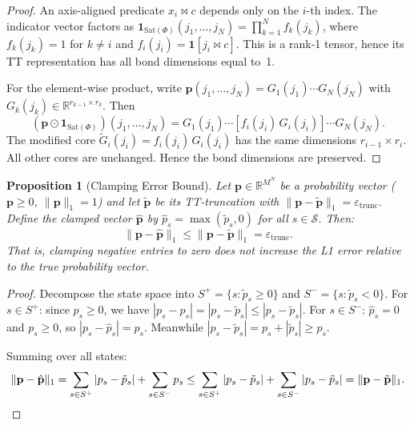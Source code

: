 \documentclass[11pt]{article}
\newtheorem{proposition}[theorem]{Proposition}
\newcommand{\norm}[1]{\lVert #1 \rVert}
\newcommand{\R}{\mathbb{R}}
\newcommand{\eps}{\varepsilon}
\newcommand{\Sat}{\mathrm{Sat}}
\newcommand{\calS}{\mathcal{S}}
\begin{document}
\begin{proof}
An axis-aligned predicate $x_i \bowtie c$ depends only on the
$i$-th index.
The indicator vector factors as
$\mathbf{1}_{\Sat(\Phi)}(j_1,\ldots,j_N) = \prod_{k=1}^{N} f_k(j_k)$,
where $f_k(j_k) = 1$ for $k \neq i$ and
$f_i(j_i) = \mathbf{1}[j_i \bowtie c]$.
This is a rank-1 tensor, hence its TT representation has all
bond dimensions equal to~1.

For the element-wise product, write
$\mathbf{p}(j_1,\ldots,j_N) = G_1(j_1)\cdots G_N(j_N)$
with $G_k(j_k) \in \R^{r_{k-1}\times r_k}$.
Then
\[
  (\mathbf{p} \odot \mathbf{1}_{\Sat(\Phi)})(j_1,\ldots,j_N)
  = G_1(j_1)\cdots [f_i(j_i)\,G_i(j_i)]\cdots G_N(j_N).
\]
The modified core $\tilde{G}_i(j_i) = f_i(j_i)\,G_i(j_i)$ has
the same dimensions $r_{i-1}\times r_i$.
All other cores are unchanged.
Hence the bond dimensions are preserved.
\end{proof}

\begin{proposition}[Clamping Error Bound]\label{prop:clamp}
Let $\mathbf{p} \in \R^{M^N}$ be a probability vector
($\mathbf{p} \geq 0$, $\norm{\mathbf{p}}_1 = 1$) and let
$\tilde{\mathbf{p}}$ be its TT-truncation with
$\norm{\mathbf{p} - \tilde{\mathbf{p}}}_1 = \eps_{\mathrm{trunc}}$.
Define the clamped vector $\hat{\mathbf{p}}$ by
$\hat{p}_s = \max(\tilde{p}_s, 0)$ for all $s \in \calS$.
Then:
\begin{equation}\label{eq:clamp}
  \norm{\mathbf{p} - \hat{\mathbf{p}}}_1
  \leq \norm{\mathbf{p} - \tilde{\mathbf{p}}}_1
  = \eps_{\mathrm{trunc}}.
\end{equation}
That is, clamping negative entries to zero does not increase the
L1 error relative to the true probability vector.
\end{proposition}

\begin{proof}
Decompose the state space into $S^+ = \{s : \tilde{p}_s \geq 0\}$
and $S^- = \{s : \tilde{p}_s < 0\}$.
For $s \in S^+$: since $p_s \geq 0$, we have
$|p_s - \hat{p}_s| = |p_s - \tilde{p}_s| \leq |p_s - \tilde{p}_s|$.
For $s \in S^-$: $\hat{p}_s = 0$ and $p_s \geq 0$, so
$|p_s - \hat{p}_s| = p_s$.
Meanwhile $|p_s - \tilde{p}_s| = p_s + |\tilde{p}_s| \geq p_s$.

Summing over all states:
\[
  \norm{\mathbf{p} - \hat{\mathbf{p}}}_1
  = \sum_{s \in S^+} |p_s - \tilde{p}_s|
    + \sum_{s \in S^-} p_s
  \leq \sum_{s \in S^+} |p_s - \tilde{p}_s|
    + \sum_{s \in S^-} |p_s - \tilde{p}_s|
  = \norm{\mathbf{p} - \tilde{\mathbf{p}}}_1.\qedhere
\]
\end{proof}
\end{document}
